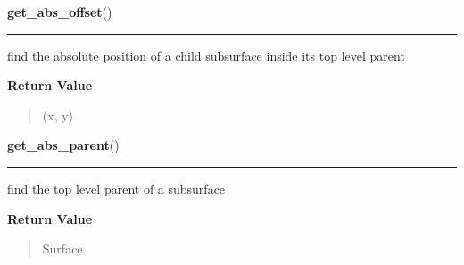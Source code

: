 \hspace{.8\funcindent}\begin{boxedminipage}{\funcwidth}

    \raggedright \textbf{get\_abs\_offset}()

    \vspace{-1.5ex}

    \rule{\textwidth}{0.5\fboxrule}
\setlength{\parskip}{2ex}
    find the absolute position of a child subsurface inside its top level 
    parent

\setlength{\parskip}{1ex}
      \textbf{Return Value}
    \vspace{-1ex}

      \begin{quote}
      (x, y)

      \end{quote}

    \end{boxedminipage}

    \label{pygame:Surface:get_abs_parent}

    \vspace{0.5ex}

\hspace{.8\funcindent}\begin{boxedminipage}{\funcwidth}

    \raggedright \textbf{get\_abs\_parent}()

    \vspace{-1.5ex}

    \rule{\textwidth}{0.5\fboxrule}
\setlength{\parskip}{2ex}
    find the top level parent of a subsurface

\setlength{\parskip}{1ex}
      \textbf{Return Value}
    \vspace{-1ex}

      \begin{quote}
      Surface

      \end{quote}

    \end{boxedminipage}

    \label{pygame:Surface:get_alpha}

    \vspace{0.5ex}

